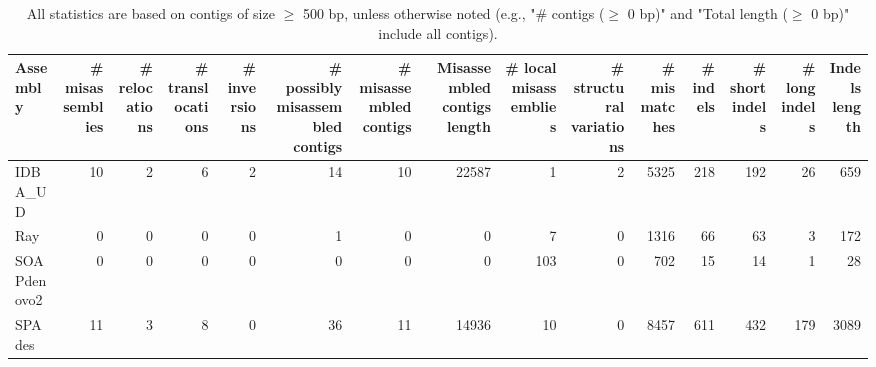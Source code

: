 \documentclass[12pt,a4paper]{article}
\begin{document}
\begin{table}[ht]
\begin{center}
\caption{All statistics are based on contigs of size $\geq$ 500 bp, unless otherwise noted (e.g., "\# contigs ($\geq$ 0 bp)" and "Total length ($\geq$ 0 bp)" include all contigs).}
\begin{tabular}{|l*{14}{|r}|}
\hline
Assembly & \# misassemblies &     \# relocations &     \# translocations &     \# inversions & \# possibly misassembled contigs & \# misassembled contigs & Misassembled contigs length & \# local misassemblies & \# structural variations & \# mismatches & \# indels &     \# short indels &     \# long indels & Indels length \\ \hline
IDBA\_UD & 10 & 2 & 6 & 2 & 14 & 10 & 22587 & 1 & 2 & 5325 & 218 & 192 & 26 & 659 \\ \hline
Ray & 0 & 0 & 0 & 0 & 1 & 0 & 0 & 7 & 0 & 1316 & 66 & 63 & 3 & 172 \\ \hline
SOAPdenovo2 & 0 & 0 & 0 & 0 & 0 & 0 & 0 & 103 & 0 & 702 & 15 & 14 & 1 & 28 \\ \hline
SPAdes & 11 & 3 & 8 & 0 & 36 & 11 & 14936 & 10 & 0 & 8457 & 611 & 432 & 179 & 3089 \\ \hline
\end{tabular}
\end{center}
\end{table}
\end{document}
